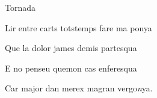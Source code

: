 \documentclass[12pt]{article}
\begin{document}
\begin{estrofaExtra}%




\begin{tornada}

\pagina{[64]} \textsection{} Tornada

\end{tornada}


\end{estrofaExtra}


\begin{estrofa}

 Lir entre carts totstemps fare ma ponya

 Que la dolor james demis partesqua

 E no penseu quemon cas enferesqua

 Car major dan merex magran vergo\textit{n}ya.

\end{estrofa}
\end{document}
